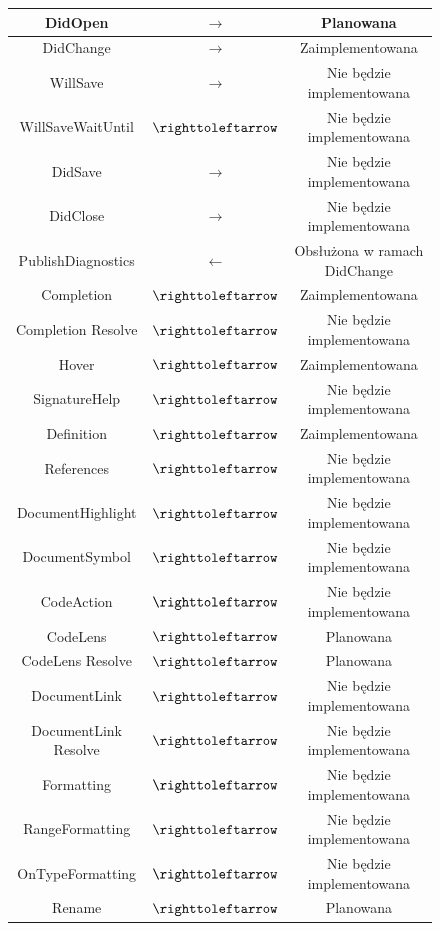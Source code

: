 \begin{figure}[H]
\begin{tabular}{|c|c|c|}
DidOpen & $\rightarrow$ &Planowana\\
\hline
DidChange & $\rightarrow$ &Zaimplementowana\\
\hline
WillSave & $\rightarrow$ & Nie będzie implementowana\\
\hline
WillSaveWaitUntil & $\righttoleftarrow$ & Nie będzie implementowana\\
\hline
DidSave & $\rightarrow$ & Nie będzie implementowana\\
\hline
DidClose & $\rightarrow$ & Nie będzie implementowana\\
\hline
PublishDiagnostics & $\leftarrow$ & Obsłużona w ramach DidChange\\
\hline
Completion & $\righttoleftarrow$ & Zaimplementowana\\
\hline
Completion Resolve & $\righttoleftarrow$ & Nie będzie implementowana\\
\hline
Hover & $\righttoleftarrow$ & Zaimplementowana\\
\hline
SignatureHelp & $\righttoleftarrow$ & Nie będzie implementowana\\
\hline
Definition & $\righttoleftarrow$ & Zaimplementowana\\
\hline
References & $\righttoleftarrow$ & Nie będzie implementowana\\
\hline
DocumentHighlight & $\righttoleftarrow$ & Nie będzie implementowana\\
\hline
DocumentSymbol & $\righttoleftarrow$ & Nie będzie implementowana\\
\hline
CodeAction & $\righttoleftarrow$ & Nie będzie implementowana\\
\hline
CodeLens & $\righttoleftarrow$ &Planowana\\
\hline
CodeLens Resolve & $\righttoleftarrow$ &Planowana\\
\hline
DocumentLink & $\righttoleftarrow$ &Nie będzie implementowana\\
\hline
DocumentLink Resolve & $\righttoleftarrow$ & Nie będzie implementowana\\
\hline
Formatting & $\righttoleftarrow$ & Nie będzie implementowana\\
\hline
RangeFormatting & $\righttoleftarrow$ & Nie będzie implementowana\\
\hline
OnTypeFormatting & $\righttoleftarrow$ & Nie będzie implementowana \\
\hline
Rename & $\righttoleftarrow$ &Planowana\\
\hline
\end{tabular}
\end{figure}

